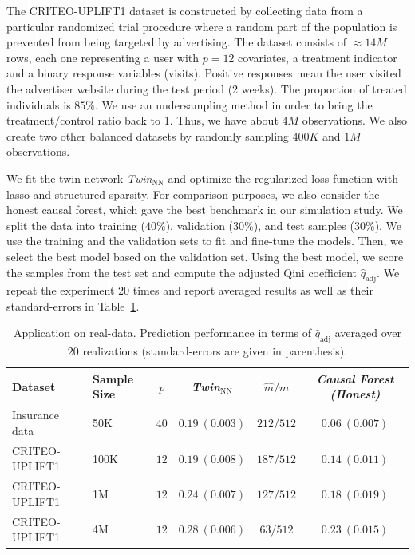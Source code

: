 \documentclass{article}
\def\qadj{\hat{q}_{\mathrm{adj}}}
\begin{document}
The CRITEO-UPLIFT1 dataset is constructed by collecting data from a particular randomized trial procedure where a random part of the population is prevented from being targeted by advertising. The dataset consists of $\approx 14M$ rows, each one representing a user with $p=12$ covariates, a treatment indicator and a binary response variables (visits). Positive responses mean the user visited the advertiser website during the test period (2 weeks). The proportion of treated individuals is $85\%$. We use an undersampling method in order to bring the treatment/control ratio back to 1. Thus, we have about $4M$ observations. We also create two other balanced datasets by randomly sampling $400K$ and $1M$ observations. 

We fit the twin-network {\it Twin$_{\mathrm{NN}}$} and optimize the regularized loss function with lasso and structured sparsity. For comparison purposes, we also consider the honest causal forest, which gave the best benchmark in our simulation study. We split the data into training ($40\%$), validation ($30\%$), and test samples ($30\%$). We use the training and the validation sets to fit and fine-tune the models. Then, we select the best model based on the validation set. Using the best model, we score the samples from the test set and compute the adjusted Qini coefficient $\qadj$. We repeat the experiment $20$ times and report averaged results as well as their standard-errors in Table~\ref{tab:final_models_results2}.\\

\begin{table}[!ht]
    \centering
    \begin{tabular}{llc|cc|c}
        \hline
        Dataset & Sample Size & $p$ &{\it Twin$_{\mathrm{NN}}$} & $\hat{m}/m$ &  {\it Causal Forest (Honest)} \\
        \hline
        Insurance data & 50K & $40$ & $0.19~(0.003)$ &  $212/512$ & $0.06~(0.007)$ \\
        CRITEO-UPLIFT1 & 100K& $12$ & $0.19~(0.008)$ & $187/512$  & $0.14~(0.011)$ \\
        CRITEO-UPLIFT1 & 1M  & $12$ & $0.24~(0.007)$ & $127/512$  & $0.18~(0.019)$ \\
        CRITEO-UPLIFT1 & 4M  & $12$ & $0.28~(0.006)$ & $63/512$   & $0.23~(0.015)$\\
        \hline
    \end{tabular}
    \vspace{2mm}
    \caption{Application on real-data. Prediction performance in terms of $\qadj$ averaged over $20$ realizations (standard-errors are given in parenthesis).}
    \label{tab:final_models_results2}
\end{table}
\end{document}

